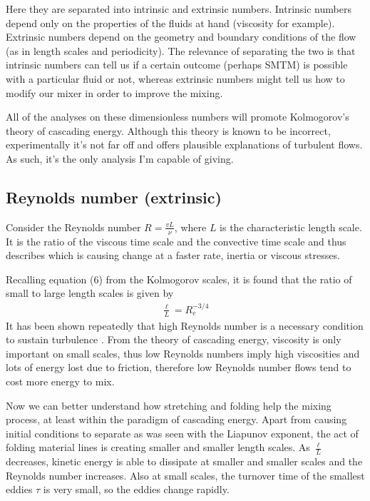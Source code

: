 \documentclass[a4paper,12pt]{article}
\begin{document}
Here they are separated into intrinsic and extrinsic numbers. Intrinsic numbers depend only on the properties of the fluids at hand (viscosity for example). Extrinsic numbers depend on the geometry and boundary conditions of the flow (as in length scales and periodicity). The relevance of separating the two is that intrinsic numbers can tell us if a certain outcome (perhaps SMTM) is possible with a particular fluid or not, whereas extrinsic numbers might tell us how to modify our mixer in order to improve the mixing. 

All of the analyses on these dimensionless numbers will promote Kolmogorov's theory of cascading energy. Although this theory is known to be incorrect, experimentally it's not far off and offers plausible explanations of turbulent flows. As such, it's the only analysis I'm capable of giving.
\subsection{Reynolds number (extrinsic)}  

Consider the Reynolds number $R = \frac{vL}{\nu}$, where $L$ is the characteristic length scale. It is the ratio of the viscous time scale and the convective time scale and thus describes which is causing change at a faster rate, inertia or viscous stresses. 

Recalling equation (6) from the Kolmogorov scales, it is found that the ratio of small to large length scales is given by 
\begin{align}
\frac{\ell}{L} = R_e^{-3/4}
\end{align} It has been shown repeatedly that high Reynolds number is a necessary condition to sustain turbulence \citep[p.~61]{dc99}. From the theory of cascading energy, viscosity is only important on small scales, thus low Reynolds numbers imply high viscosities and lots of energy lost due to friction, therefore low Reynolds number flows tend to cost more energy to mix. 

Now we can better understand how stretching and folding help the mixing process, at least within the paradigm of cascading energy. Apart from causing initial conditions to separate as was seen with the Liapunov exponent, the act of folding material lines is creating smaller and smaller length scales. As $\frac{\ell}{L}$ decreases, kinetic energy is able to dissipate at smaller and smaller scales and the Reynolds number increases. Also at small scales, the turnover time of the smallest eddies $\tau$ is very small, so the eddies change rapidly.
\end{document}
